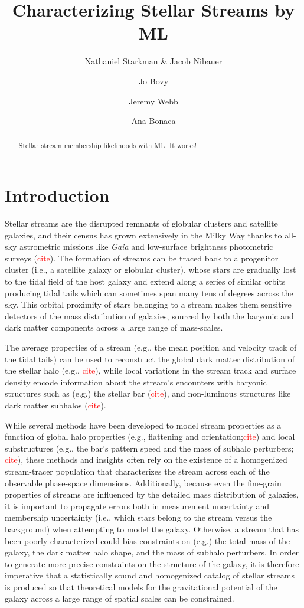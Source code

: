 \documentclass[twocolumn]{aastex631}
\newcommand{\TODO}[1]{{\textcolor{red}{#1}}}
\newcommand{\JN}[1]{\TODO{#1}}
\begin{document}
\title{Characterizing Stellar Streams by ML}

\author{Nathaniel Starkman \& Jacob Nibauer}
\author{Jo Bovy}
\author{Jeremy Webb}
\author{Ana Bonaca}

\begin{abstract}
    Stellar stream membership likelihoods with ML. It works!
\end{abstract}

\section{Introduction} \label{sec:intro}
    Stellar streams are the disrupted remnants of globular clusters and satellite galaxies, and their census has grown extensively in the Milky Way thanks to all-sky astrometric missions like {\it Gaia} and low-surface brightness photometric surveys (\JN{cite}). The formation of streams can be traced back to a progenitor cluster (i.e., a satellite galaxy or globular cluster), whose stars are gradually lost to the tidal field of the host galaxy and extend along a series of similar orbits producing tidal tails which can sometimes span many tens of degrees across the sky. This orbital proximity of stars belonging to a stream makes them sensitive detectors of the mass distribution of galaxies, sourced by both the baryonic and dark matter components across a large range of mass-scales. 
    
    The average properties of a stream (e.g., the mean position and velocity track of the tidal tails) can be used to reconstruct the global dark matter distribution of the stellar halo (e.g., \JN{cite}), while local variations in the stream track and surface density encode information about the stream's encounters with baryonic structures such as (e.g.) the stellar bar (\JN{cite}), and non-luminous structures like dark matter subhalos (\JN{cite}). 

    While several methods have been developed to model stream properties as a function of global halo properties (e.g., flattening and orientation;\JN{cite}) and local substructures (e.g., the bar's pattern speed and the mass of subhalo perturbers; \JN{cite}), these methods and insights often rely on the existence of a homogenized stream-tracer population that characterizes the stream across each of the observable phase-space dimensions. Additionally, because even the fine-grain properties of streams are influenced by the detailed mass distribution of galaxies, it is important to propagate errors both in measurement uncertainty and membership uncertainty (i.e., which stars belong to the stream versus the background) when attempting to model the galaxy. Otherwise, a stream that has been poorly characterized could bias constraints on (e.g.) the total mass of the galaxy, the dark matter halo shape, and the mass of subhalo perturbers. In order to generate more precise constraints on the structure of the galaxy, it is therefore imperative that a statistically sound and homogenized catalog of stellar streams is produced so that theoretical models for the gravitational potential of the galaxy across a large range of spatial scales can be constrained. 
\end{document}
